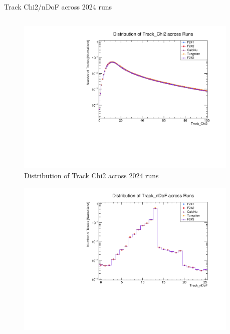 \begin{frame}{Track Chi2/nDoF across 2024 runs}
	\begin{columns}
		\begin{column}{0.5 \linewidth}
			\vspace{-0.4cm}
			\begin{figure}
				\includegraphics[width=\linewidth]{./RunwisePlots/Track_Chi2_runwise.pdf}
				\caption{Distribution of Track Chi2 across 2024 runs}
			\end{figure}
			\vspace{-0.9cm}
			\begin{figure}
				\includegraphics[width=\linewidth]{./RunwisePlots/Track_nDoF_runwise.pdf}
			\end{figure}
		\end{column}
		\begin{column}{0.5 \linewidth}

\end{column}
\end{columns}
\end{frame}
